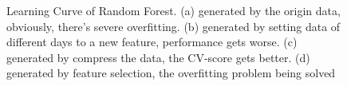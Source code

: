 \documentclass[conference, a4paper]{IEEEtran}
\begin{document}
  \begin{figure}[!htb]
    \centering
  \hfill
    \caption{Learning Curve of Random Forest. (a) generated by the origin data, obviously, there's severe overfitting. (b) generated by setting data of different days to a new feature, performance gets worse. (c) generated by compress the data, the CV-score gets better. (d) generated by feature selection, the overfitting problem being solved}
  \end{figure}
\end{document}
